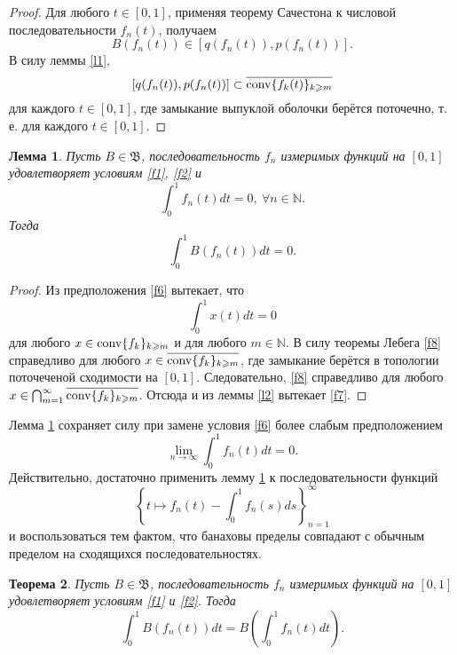 \documentclass[12pt]{article}
\newtheorem{thm}{Теорема}
\newtheorem{lem}[thm]{Лемма}
\def\N{{\mathbb{N}}}
\def\B{{\mathfrak{B}}}
\begin{document}
\begin{proof}
Для любого $t\in[0,1]$, применяя теорему Сачестона \cite{S} к числовой последовательности $f_n(t)$, получаем
\begin{equation}\label{f4}
B(f_n(t)) \in \left[ q(f_n(t)), p(f_n(t)) \right].
 \end{equation}
 В силу леммы \ref{l1},
 \begin{equation}\label{f5}
\left[ q(f_n(t)), p(f_n(t)) \right]\subset \overline{{\rm conv} \{f_k(t)\}_{k\geqslant m}}
 \end{equation}
 для каждого $t\in[0,1]$, где замыкание выпуклой оболочки берётся поточечно, т. е. для каждого $t\in[0,1]$.
\end{proof}


\begin{lem}\label{l3}
Пусть $B\in \B$, последовательность $f_n$  измеримых функций на $[0,1]$  удовлетворяет условиям \eqref{f1}, \eqref{f2} и
\begin{equation}\label{f6}
\int_0^1 f_n(t) dt=0, \ \forall n\in \N.
\end{equation}
Тогда
\begin{equation}\label{f7}
\int_0^1 B(f_n(t)) dt=0.
\end{equation}
\end{lem}

 \begin{proof}
 Из предположения \eqref{f6} вытекает, что
 \begin{equation}\label{f8}
\int_0^1 x(t) dt=0
\end{equation}
для любого $x\in {\rm conv} \{f_k\}_{k\geqslant m}$ и для любого $m\in \N.$ В силу теоремы Лебега \eqref{f8} справедливо для любого $x\in \overline{{\rm conv} \{f_k\}_{k\geqslant m}}$, где замыкание берётся в топологии поточеченой сходимости на $[0,1]$. Следовательно, \eqref{f8} справедливо для любого $x\in \bigcap_{m=1}^\infty\overline{{\rm conv} \{f_k\}_{k\geqslant m}}$. Отсюда и из леммы \ref{l2} вытекает \eqref{f7}.
 \end{proof}

Лемма \ref{l3} сохраняет силу при замене условия \eqref{f6} более слабым предположением
$$ \lim_{n\to\infty} \int_0^1 f_n(t) dt=0.$$
Действительно, достаточно применить лемму \ref{l3} к последовательности функций
$$\left\{ t\mapsto f_n(t)-\int_0^1 f_n(s) ds\right\}_{n=1}^\infty$$
и воспользоваться тем фактом, что банаховы пределы совпадают с обычным пределом на сходящихся последовательностях.

 \begin{thm}\label{t1}
Пусть $B\in \B$, последовательность $f_n$  измеримых функций на $[0,1]$  удовлетворяет условиям \eqref{f1} и  \eqref{f2}.
Тогда
\begin{equation*}
\int_0^1 B(f_n(t)) dt = B\left(\int_0^1 f_n(t) dt\right).
 \end{equation*}
\end{thm}
\end{document}
